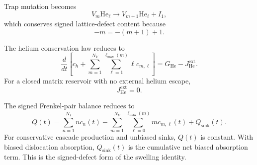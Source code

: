 Trap mutation becomes
\begin{equation}
    V_m\mathrm{He}_{\ell}
    \longrightarrow
    V_{m+1}\mathrm{He}_{\ell}
    +
    I_1,
    \label{eq:VIHe_trap_mutation}
\end{equation}
which conserves signed lattice-defect content because
\begin{equation}
    -m=-(m+1)+1 .
\end{equation}

The helium conservation law reduces to
\begin{equation}
    \frac{d}{dt}
    \left[
    c_h
    +
    \sum_{m=1}^{N_V}
    \sum_{\ell=1}^{\ell_{\max}(m)}
    \ell c_{m,\ell}
    \right]
    =
    G_{\mathrm{He}}
    -
    J_{\mathrm{He}}^{\mathrm{ext}} .
    \label{eq:He_conservation_specialized}
\end{equation}
For a closed matrix reservoir with no external helium escape,
\begin{equation}
    J_{\mathrm{He}}^{\mathrm{ext}}=0 .
\end{equation}

The signed Frenkel-pair balance reduces to
\begin{equation}
    Q(t)
    =
    \sum_{n=1}^{N_I} n c_n(t)
    -
    \sum_{m=1}^{N_V}
    \sum_{\ell=0}^{\ell_{\max}(m)}
    m c_{m,\ell}(t)
    +
    Q_{\mathrm{sink}}(t) .
    \label{eq:VIHe_signed_balance}
\end{equation}
For conservative cascade production and unbiased sinks, $Q(t)$ is constant.
With biased dislocation absorption, $Q_{\mathrm{sink}}(t)$ is the cumulative
net biased absorption term. This is the signed-defect form of the swelling
identity.
